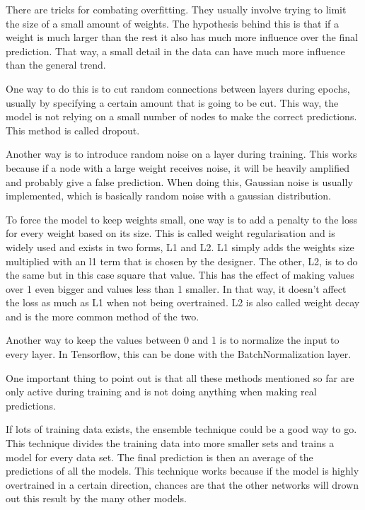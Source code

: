 \cite{overfitting}

There are tricks for combating overfitting. They usually involve trying to limit the size of a small amount of weights.
The hypothesis behind this is that if a weight is much larger than the rest it also has much more influence over the final prediction. That way, a small detail in the data can have much more influence than the general trend.

One way to do this is to cut random connections between layers during epochs, usually by specifying a certain amount that is going to be cut.
This way, the model is not relying on a small number of nodes to make the correct predictions. This method is called dropout.

Another way is to introduce random noise on a layer during training. This works because if a node with a large weight receives noise, it will be heavily amplified and probably give a false prediction.
When doing this, Gaussian noise is usually implemented, which is basically random noise with a gaussian distribution.

To force the model to keep weights small, one way is to add a penalty to the loss for every weight based on its size. 
This is called weight regularisation and is widely used and exists in two forms, L1 and L2.
L1 simply adds the weights size multiplied with an l1 term that is chosen by the designer.
The other, L2, is to do the same but in this case square that value. This has the effect of making values over 1 even bigger and values less than 1 smaller.
In that way, it doesn't affect the loss as much as L1 when not being overtrained. L2 is also called weight decay and is the more common method of the two.

Another way to keep the values between 0 and 1 is to normalize the input to every layer. In Tensorflow, this can be done with the BatchNormalization layer.

One important thing to point out is that all these methods mentioned so far are only active during training and is not doing anything when making real predictions.


If lots of training data exists, the ensemble technique could be a good way to go. This technique divides the training data into more smaller sets and trains a model for every data set.
The final prediction is then an average of the predictions of all the models. This technique works because if the model is highly overtrained in a certain direction, chances are that the other networks will drown out this result by the many other models.

